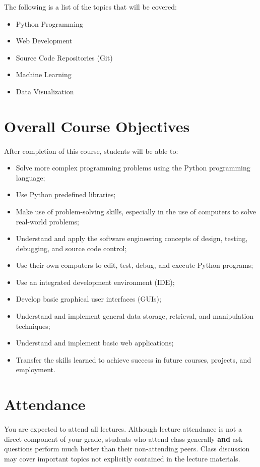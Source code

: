 \documentclass[letter,11pt]{article}
\begin{document}
The following is a list of the topics that will be covered:
\begin{itemize}
\item Python Programming
\item Web Development
\item Source Code Repositories (Git)
\item Machine Learning
\item Data Visualization
\end{itemize}

\section*{Overall Course Objectives}
\paragraph{}After completion of this course, students will be able to:
\begin{itemize}
    \item Solve more complex programming problems using the Python programming language;
    \item Use Python predefined libraries;
    \item Make use of problem-solving skills, especially in the use of computers to solve real-world problems;
    \item Understand and apply the software engineering concepts of design, testing, debugging, and source code control;
    \item Use their own computers to edit, test, debug, and execute Python programs;
    \item Use an integrated development environment (IDE);
    \item Develop basic graphical user interfaces (GUIs);
    \item Understand and implement general data storage, retrieval, and manipulation techniques;
    \item Understand and implement basic web applications;
    \item Transfer the skills learned to achieve success in future courses, projects, and employment.
\end{itemize}

\section*{Attendance}
\paragraph{}You are expected to attend all lectures. Although lecture attendance is not a direct component of your grade, students who attend class generally \textbf{and} ask questions perform much better than their non-attending peers. Class discussion may cover important topics not explicitly contained in the lecture materials.
\end{document}
